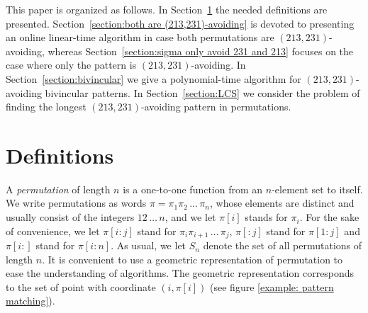 \documentclass[a4paper]{llncs}
\DeclareMathOperator{\RED}{red}
\begin{document}
	This paper is organized as follows.
	In Section~\ref{section:Definitions} the needed definitions are presented.
	Section~\ref{section:both are (213,231)-avoiding} is devoted to presenting
	an online linear-time algorithm in case both 
	permutations are $(213,231)$-avoiding,
	whereas Section~\ref{section:sigma only avoid 231 and 213} focuses on the case
	where only the pattern is $(213,231)$-avoiding.
	In Section~\ref{section:bivincular} we give a polynomial-time algorithm
	for $(213,231)$-avoiding bivincular patterns.
	In Section~\ref{section:LCS} we consider the problem of finding the longest
	$(213,231)$-avoiding pattern in permutations.


\section{Definitions}
\label{section:Definitions}

A \emph{permutation} of length $n$ is a one-to-one function from an
$n$-element set to itself.
We write permutations as words
$\pi = \pi_1\pi_2\,\ldots\,\pi_n$, whose elements are distinct
and usually consist of the integers $12\,\ldots\,n$, and we let
$\pi[i]$ stands for $\pi_i$.
For the sake of convenience, we let
$\pi[i:j]$ stand for
$\pi_i\pi_{i+1}\,\ldots\,\pi_j$,
$\pi[:j]$ stand for $\pi[1:j]$ and
$\pi[i:]$ stand for $\pi[i:n]$.
As usual, we let $S_n$ denote the set of all permutations of length $n$.
It is convenient to use a geometric representation of permutation
to ease the understanding of algorithms. 
The geometric representation corresponds to the set of point with coordinate $(i,\pi[i])$
(see figure \ref{example: pattern matching}).

\end{document}
